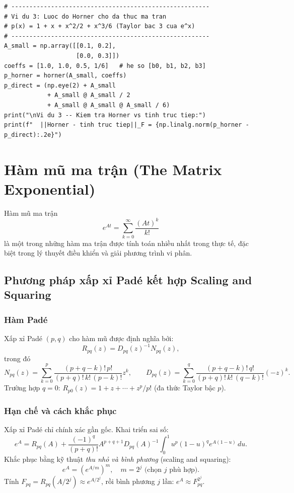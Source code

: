 \documentclass[12pt,a4paper]{report}
\begin{document}
\begin{lstlisting}[style=python, caption={Phương pháp xấp xỉ: Taylor cắt cụt, Horner, và hiện tượng catastrophic cancellation}]
# -------------------------------------------------------
# Vi du 3: Luoc do Horner cho da thuc ma tran
# p(x) = 1 + x + x^2/2 + x^3/6 (Taylor bac 3 cua e^x)
# -------------------------------------------------------
A_small = np.array([[0.1, 0.2],
                    [0.0, 0.3]])
coeffs = [1.0, 1.0, 0.5, 1/6]   # he so [b0, b1, b2, b3]
p_horner = horner(A_small, coeffs)
p_direct = (np.eye(2) + A_small
            + A_small @ A_small / 2
            + A_small @ A_small @ A_small / 6)
print("\nVi du 3 -- Kiem tra Horner vs tinh truc tiep:")
print(f"  ||Horner - tinh truc tiep||_F = {np.linalg.norm(p_horner - p_direct):.2e}")
\end{lstlisting}

\section{Hàm mũ ma trận (The Matrix Exponential)}
\label{sec:expm}

Hàm mũ ma trận
\[
  e^{At} = \sum_{k=0}^{\infty} \frac{(At)^k}{k!}
\]
là một trong những hàm ma trận được tính toán nhiều nhất trong thực tế, đặc biệt
trong lý thuyết điều khiển và giải phương trình vi phân.

\subsection{Phương pháp xấp xỉ Padé kết hợp Scaling and Squaring}

\subsubsection{Hàm Padé}

Xấp xỉ Padé $(p,q)$ cho hàm mũ được định nghĩa bởi:
\[
  R_{pq}(z) = D_{pq}(z)^{-1} N_{pq}(z),
\]
trong đó
\[
  N_{pq}(z) = \sum_{k=0}^{p} \frac{(p+q-k)!\,p!}{(p+q)!\,k!\,(p-k)!} z^k,
  \qquad
  D_{pq}(z) = \sum_{k=0}^{q} \frac{(p+q-k)!\,q!}{(p+q)!\,k!\,(q-k)!} (-z)^k.
\]
Trường hợp $q=0$: $R_{p0}(z) = 1 + z + \cdots + z^p/p!$ (đa thức Taylor bậc $p$).

\subsubsection{Hạn chế và cách khắc phục}

Xấp xỉ Padé chỉ chính xác gần gốc. Khai triển sai số:
\[
  e^A = R_{pq}(A)
  + \frac{(-1)^q}{(p+q)!} A^{p+q+1} D_{pq}(A)^{-1}
    \int_0^1 u^p(1-u)^q e^{A(1-u)}\,du.
\]
Khắc phục bằng kỹ thuật \emph{thu nhỏ và bình phương} (scaling and squaring):
\[
  e^A = \left(e^{A/m}\right)^m, \quad m = 2^j \text{ (chọn $j$ phù hợp)}.
\]
Tính $F_{pq} = R_{pq}(A/2^j) \approx e^{A/2^j}$, rồi bình phương $j$ lần:
$e^A \approx F_{pq}^{2^j}$.
\end{document}
